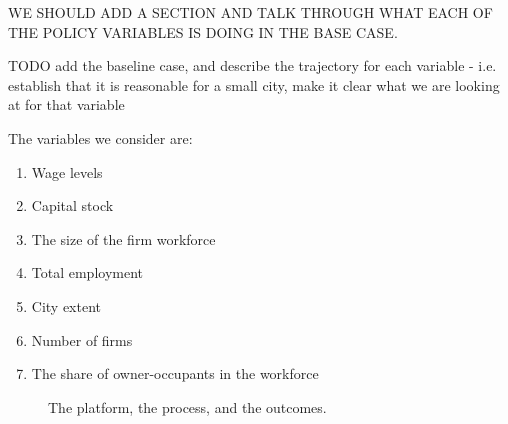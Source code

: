 {\color{red} WE SHOULD ADD A SECTION AND TALK THROUGH WHAT EACH OF THE POLICY VARIABLES IS DOING IN THE BASE CASE.}

{\color{red} TODO add the baseline case, and describe the trajectory for each variable - i.e. establish that it is reasonable for a small city, make it clear what we are looking at for that variable}

The variables we consider are:
\begin{enumerate}
    \item Wage levels
    \item Capital stock
    \item The size of the firm workforce
    \item Total employment
    \item City extent
    \item Number of firms
    \item The share of owner-occupants in the workforce
\end{enumerate} 

\begin{figure}
\centering
{}
\caption[The platform, the process, and the outcomes]{The platform, the process, and the outcomes.}
\label{fig:outcomes}
\end{figure}

